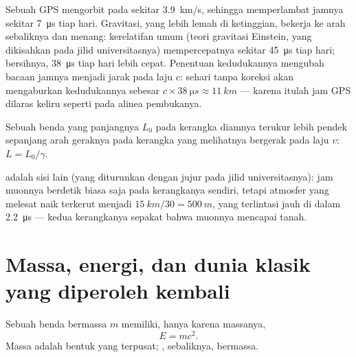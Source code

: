 \begin{remark}\label{rem:g12:special-relativity:gps}
Sebuah  GPS mengorbit pada sekitar \qty{3.9}{km/s}, sehingga 
memperlambat jamnya sekitar \qty{7}{\micro s} tiap hari. Gravitasi, yang lebih lemah di
ketinggian, bekerja ke arah sebaliknya dan menang: kerelatifan umum (teori
gravitasi Einstein, yang dikisahkan pada jilid universitasnya) mempercepatnya sekitar
\qty{45}{\micro s} tiap hari; bersihnya, \qty{38}{\micro s} tiap hari lebih cepat.
Penentuan kedudukannya mengubah bacaan jamnya menjadi
jarak pada laju $c$: sehari tanpa koreksi akan mengaburkan kedudukannya sebesar
$c \times \qty{38}{\micro s} \approx \qty{11}{km}$ --- karena itulah jam GPS
dilaras keliru seperti pada alinea pembukanya.
\end{remark}

\begin{proposition}\label{prop:g12:special-relativity:contraction}
Sebuah benda yang panjangnya $L_0$ pada kerangka diamnya terukur lebih pendek sepanjang
arah geraknya pada kerangka yang melihatnya bergerak pada laju $v$:
$L = L_0/\gamma$.
\end{proposition}
\admitted

\begin{remark}\label{rem:g12:special-relativity:muonframe}
 adalah sisi lain  (yang diturunkan dengan jujur pada
jilid universitasnya): jam muonnya berdetik biasa saja pada kerangkanya sendiri, tetapi
atmosfer yang melesat naik terkerut menjadi $\qty{15}{km}/30 =
\qty{500}{m}$, yang terlintasi jauh di dalam \qty{2.2}{\micro s} --- kedua kerangkanya
sepakat bahwa muonnya mencapai tanah.
\end{remark}

\section{Massa, energi, dan dunia klasik yang diperoleh kembali}

\begin{theorem}\label{thm:g12:special-relativity:emc2}
Sebuah benda bermassa $m$ memiliki, hanya karena massanya, 
\[ E = m c^2 . \]
Massa adalah bentuk  yang terpusat; , sebaliknya, bermassa.
\end{theorem}
\admitted

